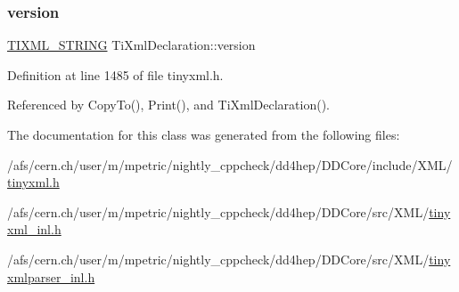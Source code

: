 \subsubsection{\texorpdfstring{version}{version}}
{\footnotesize\ttfamily \hyperlink{tinyxml_8h_a92bada05fd84d9a0c9a5bbe53de26887}{T\+I\+X\+M\+L\+\_\+\+S\+T\+R\+I\+NG} Ti\+Xml\+Declaration\+::version\hspace{0.3cm}{\ttfamily [private]}}



Definition at line 1485 of file tinyxml.\+h.



Referenced by Copy\+To(), Print(), and Ti\+Xml\+Declaration().



The documentation for this class was generated from the following files\+:\begin{DoxyCompactItemize}
\item 
/afs/cern.\+ch/user/m/mpetric/nightly\+\_\+cppcheck/dd4hep/\+D\+D\+Core/include/\+X\+M\+L/\hyperlink{tinyxml_8h}{tinyxml.\+h}\item 
/afs/cern.\+ch/user/m/mpetric/nightly\+\_\+cppcheck/dd4hep/\+D\+D\+Core/src/\+X\+M\+L/\hyperlink{tinyxml__inl_8h}{tinyxml\+\_\+inl.\+h}\item 
/afs/cern.\+ch/user/m/mpetric/nightly\+\_\+cppcheck/dd4hep/\+D\+D\+Core/src/\+X\+M\+L/\hyperlink{tinyxmlparser__inl_8h}{tinyxmlparser\+\_\+inl.\+h}\end{DoxyCompactItemize}
